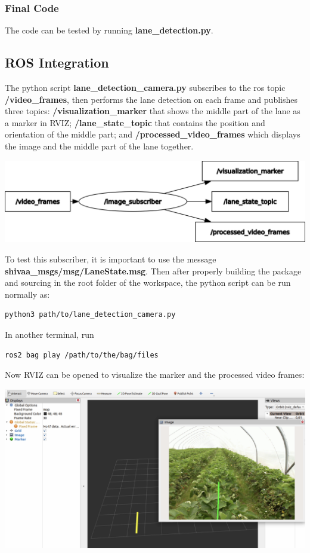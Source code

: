 \documentclass[12pt]{article}
\begin{document}
\subsubsection*{Final Code}

The code can be tested by running \textbf{lane\_detection.py}. 

\newpage
\subsection{ROS Integration}
The python script \textbf{lane\_detection\_camera.py} subscribes to the ros topic \textbf{/video\_frames}, then performs the lane detection on each frame and publishes three topics: \textbf{/visualization\_marker} that shows the middle part of the lane as a marker in RVIZ; \textbf{/lane\_state\_topic} that contains the position and orientation of the middle part; and \textbf{/processed\_video\_frames} which displays the image and the middle part of the lane together.

\begin{center}
\includegraphics[width=1.0\textwidth]{Bilder/rqt}
\end{center}

To test this subscriber, it is important to use the message \textbf{shivaa\_msgs/msg/LaneState.msg}. Then after properly building the package and sourcing in the root folder of the workspace, the python script can be run normally as:
\begin{lstlisting}[language=csh]
python3 path/to/lane_detection_camera.py
\end{lstlisting}

In another terminal, run 

\begin{lstlisting}[language=csh]
ros2 bag play /path/to/the/bag/files
\end{lstlisting}

Now RVIZ can be opened to visualize the marker and the processed video frames:

\begin{center}
\includegraphics[width=1.0\textwidth]{Bilder/visual_topics}
\end{center}
\end{document}
